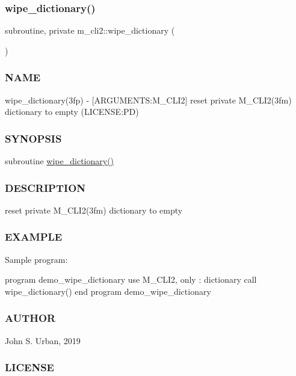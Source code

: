 \subsubsection{\texorpdfstring{wipe\+\_\+dictionary()}{wipe\_dictionary()}}
{\footnotesize\ttfamily subroutine, private m\+\_\+cli2\+::wipe\+\_\+dictionary (\begin{DoxyParamCaption}{ }\end{DoxyParamCaption})\hspace{0.3cm}{\ttfamily [private]}}



\subsubsection*{N\+A\+ME}

wipe\+\_\+dictionary(3fp) -\/ \mbox{[}A\+R\+G\+U\+M\+E\+N\+TS\+:M\+\_\+\+C\+L\+I2\mbox{]} reset private M\+\_\+\+C\+L\+I2(3fm) dictionary to empty (L\+I\+C\+E\+N\+SE\+:PD) \subsubsection*{S\+Y\+N\+O\+P\+S\+IS}

subroutine \mbox{\hyperlink{namespacem__cli2_ab1525b0419475486f520ef502daa5e94}{wipe\+\_\+dictionary()}} \subsubsection*{D\+E\+S\+C\+R\+I\+P\+T\+I\+ON}

reset private M\+\_\+\+C\+L\+I2(3fm) dictionary to empty \subsubsection*{E\+X\+A\+M\+P\+LE}

Sample program\+: \begin{DoxyVerb} program demo_wipe_dictionary
 use M_CLI2, only : dictionary
    call wipe_dictionary()
 end program demo_wipe_dictionary
\end{DoxyVerb}
 \subsubsection*{A\+U\+T\+H\+OR}

John S. Urban, 2019 \subsubsection*{L\+I\+C\+E\+N\+SE}

